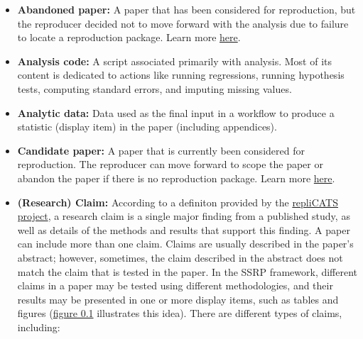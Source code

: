 \documentclass[
]{book}
\begin{document}
\begin{itemize}
\item
  \textbf{Abandoned paper:} A paper that has been considered for reproduction, but the reproducer decided not to move forward with the analysis due to failure to locate a reproduction package. Learn more \href{https://bitss.github.io/ACRE/scoping.html\#from-candidate-to-declared-paper}{here}.
\item
  \textbf{Analysis code:} A script associated primarily with analysis. Most of its content is dedicated to actions like running regressions, running hypothesis tests, computing standard errors, and imputing missing values.
\item
  \textbf{Analytic data:} Data used as the final input in a workflow to produce a statistic (display item) in the paper (including appendices).
\item
  \textbf{Candidate paper:} A paper that is currently been considered for reproduction. The reproducer can move forward to scope the paper or abandon the paper if there is no reproduction package. Learn more \href{https://bitss.github.io/ACRE/scoping.html\#from-candidate-to-declared-paper}{here}.
\item
  \textbf{(Research) Claim:} According to a definiton provided by the \href{https://replicats.research.unimelb.edu.au/\#tab301}{repliCATS project}, a research claim is a single major finding from a published study, as well as details of the methods and results that support this finding. A paper can include more than one claim. Claims are usually described in the paper's abstract; however, sometimes, the claim described in the abstract does not match the claim that is tested in the paper.
  In the SSRP framework, different claims in a paper may be tested using different methodologies, and their results may be presented in one or more display items, such as tables and figures (\href{https://bitss.github.io/ACRE/intro.html\#fig:diagram}{figure 0.1} illustrates this idea). There are different types of claims, including:


\end{itemize}
\end{document}
